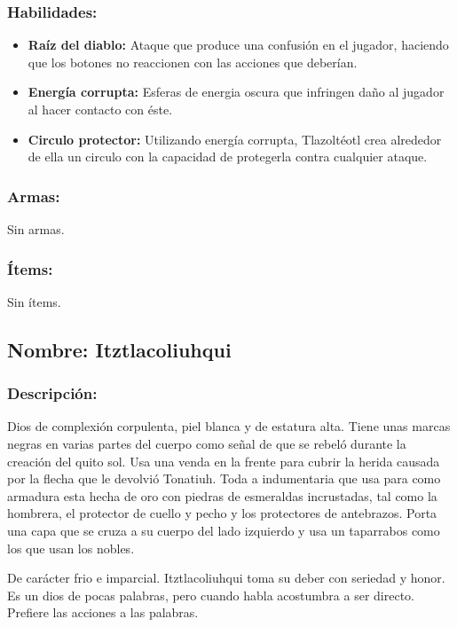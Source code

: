 \documentclass[11pt,letterpaper]{article}
\begin{document}
\subsubsection{Habilidades:}
\begin{itemize}
	\item \textbf{Raíz del diablo:} Ataque que produce una confusión en el jugador, haciendo que los botones no reaccionen con las acciones que deberían.
	\item \textbf{Energía corrupta:} Esferas de energia oscura que infringen daño al jugador al hacer contacto con éste.
	\item \textbf{Circulo protector:} Utilizando energía corrupta,  Tlazoltéotl crea alrededor de ella un circulo con la capacidad de protegerla contra cualquier ataque.
\end{itemize} 
\subsubsection{Armas:}
Sin armas.
\subsubsection{Ítems:}
Sin ítems.



\subsection{Nombre: Itztlacoliuhqui}  

\subsubsection{Descripción:}
Dios de complexión corpulenta, piel blanca y de estatura alta. Tiene unas marcas negras en varias partes del cuerpo como señal de que se rebeló durante la creación del quito sol. Usa una venda en la frente para cubrir la herida causada por la flecha que le devolvió Tonatiuh. Toda a indumentaria que usa para como armadura esta hecha de oro con piedras de esmeraldas incrustadas, tal como la hombrera, el protector de cuello y pecho y los protectores de antebrazos. Porta una capa que se cruza a su cuerpo del lado izquierdo y usa un taparrabos como los que usan los nobles.
\\
\par
De carácter frio e imparcial. Itztlacoliuhqui toma su deber con seriedad y honor. Es un dios de pocas palabras, pero cuando habla acostumbra a ser directo. Prefiere las acciones a las palabras. 
\end{document}
